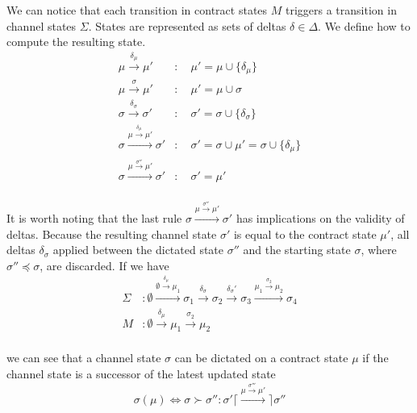 \documentclass{llncs}
\begin{document}
We can notice that each transition in contract states $M$ triggers a transition in channel states $\Sigma$. States are represented as sets of deltas $\delta \in \Delta$. We define how to compute the resulting state.
\begin{equation*}
\begin{split}
    \mu \xrightarrow{\delta_\mu} \mu' &: \quad \mu' = \mu \cup \{\delta_\mu\} \\
    \mu \xrightarrow{\sigma} \mu' &: \quad \mu' = \mu \cup \sigma \\
    \sigma \xrightarrow{\delta_\sigma} \sigma' &: \quad \sigma' = \sigma \cup \{ \delta_\sigma \}  \\
    \sigma \xrightarrow{\mu \xrightarrow{\delta_\mu} \mu'} \sigma' &: \quad \sigma' =  \sigma \cup \mu' = \sigma \cup \{ \delta_\mu \} \\
    \sigma \xrightarrow{\mu \xrightarrow{\sigma''} \mu'} \sigma' &: \quad \sigma' = \mu' \\
\end{split}
\end{equation*}

It is worth noting that the last rule $\sigma \xrightarrow{\mu \xrightarrow{\sigma''} \mu'} \sigma'$ has implications on the validity of deltas. Because the resulting channel state $\sigma'$ is equal to the contract state $\mu'$, all deltas $\delta_\sigma$ applied between the dictated state $\sigma''$ and the starting state $\sigma$, where $\sigma'' \preceq \sigma$, are discarded. If we have
\begin{equation*}
\begin{split}
    \Sigma&: \emptyset \xrightarrow{\emptyset \xrightarrow{\delta_\mu} \mu_1} \sigma_1 \xrightarrow{\delta_\sigma} \sigma_2 \xrightarrow{\delta_\sigma'} \sigma_3 \xrightarrow{\mu_1 \xrightarrow{\sigma_2} \mu_2} \sigma_4\\
    M&: \emptyset \xrightarrow{\delta_\mu} \mu_1 \xrightarrow{\sigma_2} \mu_2 \\
\end{split}
\end{equation*}

we can see that a channel state $\sigma$ can be dictated on a contract state $\mu$ if the channel state is a successor of the latest updated state
$$\sigma(\mu) \iff \sigma \succ \sigma'' : \sigma' \lceil \xrightarrow{\mu \xrightarrow{\sigma'''} \mu'} \rceil \sigma''$$

\end{document}
